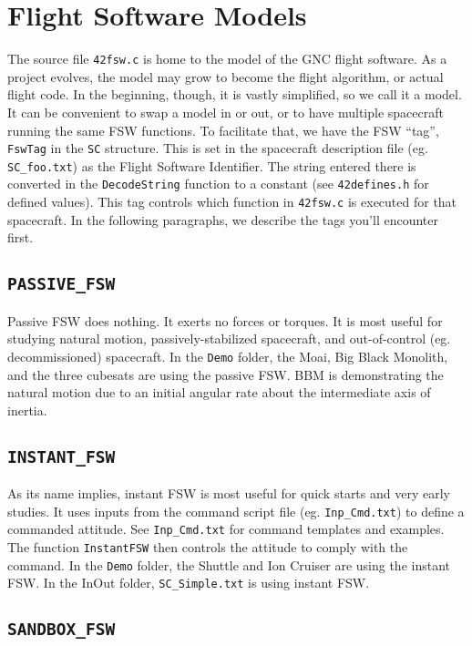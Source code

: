 \documentclass[12pt]{article}
\begin{document}
\section{Flight Software Models}

The source file {\tt 42fsw.c} is home to the model of the GNC flight software.  As a project evolves, the model may grow to become the flight algorithm, or actual flight code.  In the beginning, though, it is vastly simplified, so we call it a model.  It can be convenient to swap a model in or out, or to have multiple spacecraft running the same FSW functions.  To facilitate that, we have the FSW ``tag'', {\tt FswTag} in the {\tt SC} structure.  This is set in the spacecraft description file (eg. {\tt SC\_foo.txt}) as the Flight Software Identifier.   The string entered there is converted in the {\tt DecodeString} function to a constant (see {\tt 42defines.h} for defined values).  This tag controls which function in {\tt 42fsw.c} is executed for that spacecraft.  In the following paragraphs, we describe the tags you'll encounter first.

\subsection{\tt PASSIVE\_FSW}

Passive FSW does nothing.  It exerts no forces or torques.  It is most useful for studying natural motion, passively-stabilized spacecraft, and out-of-control (eg. decommissioned) spacecraft.  In the {\tt Demo} folder, the Moai, Big Black Monolith, and the three cubesats are using the passive FSW.  BBM is demonstrating the natural motion due to an initial angular rate about the intermediate axis of inertia.

\subsection{\tt INSTANT\_FSW}

As its name implies, instant FSW is most useful for quick starts and very early studies.  It uses inputs from the command script file (eg. {\tt Inp\_Cmd.txt}) to define a commanded attitude.  See {\tt Inp\_Cmd.txt} for command templates and examples.  The function {\tt InstantFSW} then controls the attitude to comply with the command.  In the {\tt Demo} folder, the Shuttle and Ion Cruiser are using the instant FSW.  In the InOut folder, {\tt SC\_Simple.txt} is using instant FSW.

\subsection{\tt SANDBOX\_FSW}
\end{document}
